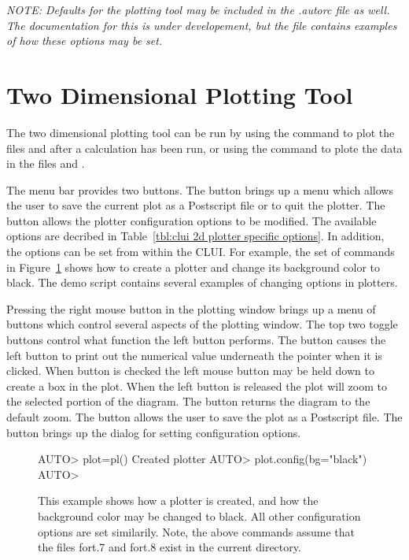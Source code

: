 \documentclass[12pt]{report}
\begin{document}
 {\em NOTE:  Defaults for the plotting tool may be included in
 the .autorc file as well.  The documentation for this
 is under developement, but the file 
 contains examples of how these options may be set.}

 \section{Two Dimensional Plotting Tool}\label{clui:2d plotting}

 The two dimensional plotting tool can be run by using the command
  to plot the files  and 
 after a calculation has been run, or using the command
  to plote the data in the
 files  and .  

 The menu bar provides two buttons.  The 
 button brings up a menu which allows the user to save
 the current plot as a Postscript file or
 to quit the plotter.
 The  button allows the plotter
 configuration options to be modified.
 The available options are decribed in
 Table~\ref{tbl:clui 2d plotter specific options}.  In addition, the options can 
 be set from within the CLUI.  For example,
 the set of commands in Figure~\ref{exa:plotter_example} shows how to
 create a plotter and change its background color to black.  The
 demo script  contains several
 examples of changing options in plotters.

 Pressing the right mouse button in the plotting window brings
 up a menu of buttons which control several aspects
 of the plotting window.  The top two toggle buttons
 control what function the left button performs.  
 The  button causes the
 left button to print out the numerical value underneath
 the pointer when it is clicked.
 When  button is checked the left
 mouse button may be held down to create
 a box in the plot.  When the left button
 is released the plot will zoom to the selected
 portion of the diagram.
 The  button returns the
 diagram to the default zoom. 
 The  button allows the user
 to save the plot as a Postscript file.
 The  button brings up
 the dialog for setting configuration options.

 \begin{figure}[htbp]
 {\small \begin{center} \begin{boxedverbatim} 
 AUTO> plot=pl()
 Created plotter
 AUTO> plot.config(bg="black")
 AUTO> 
 \end{boxedverbatim}
 \end{center} 
 }
 \caption[Configuring a two-dimensional plotter.]
 {This example shows how a plotter is created, and
 how the background color may be changed to black.
 All other configuration options are set similarily.
 Note, the above commands assume that the files
 fort.7 and fort.8 exist in the current directory.
 }
 \label{exa:plotter_example}
 \end{figure}
\end{document}
